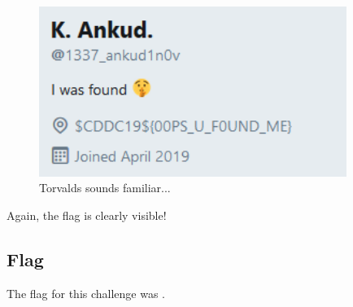 		\begin{figure}[!htbp]\centering
			\includegraphics[width=100mm]{figures/osintblue/b42.png} \vspace{5mm}
			\caption{Torvalds sounds familiar...}
		\end{figure}

		Again, the flag is clearly visible!


	\subsection{Flag}
		The flag for this challenge was .













